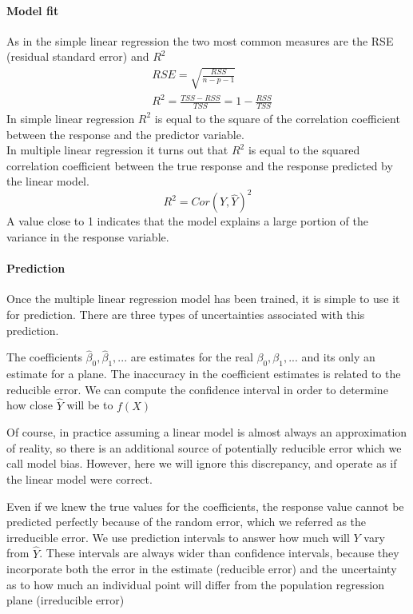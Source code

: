 \documentclass[../document.tex]{subfiles}
\begin{document}
	\paragraph{Model fit}
	As in the simple linear regression the two most common measures are the RSE (residual standard error) and \(R^2\)
	\begin{equation}
	\begin{split}
		&RSE = \sqrt{\frac{RSS}{n-p-1}}\\
		&R^2 = \frac{TSS-RSS}{TSS}=1-\frac{RSS}{TSS}
	\end{split}
	\end{equation}
	In simple linear regression \(R^2\) is equal to the square of the correlation coefficient between the response and the predictor variable.\\
	In multiple linear regression it turns out that \(R^2\) is equal to the squared correlation coefficient between the true response and the response predicted by the linear model.
	\begin{equation}
		R^2=Cor(Y,\hat{Y})^2
	\end{equation}
	A value close to 1 indicates that the model explains a large portion of the variance in the response variable.

	\paragraph{Prediction}
	Once the multiple linear regression model has been trained, it is simple to use it for prediction. There are three types of uncertainties associated with this prediction.
	\begin{description}
		\item The coefficients \(\hat{\beta}_{0},\hat{\beta}_{1},...\) are estimates for the real \(\beta_{0},\beta_{1},...\) and its only an estimate for a plane. The inaccuracy in the coefficient estimates is related to the reducible error. We can compute the confidence interval in order to determine how close \(\hat{Y}\) will be to \(f(X)\)
		\item Of course, in practice assuming a linear model is almost always an approximation of reality, so there is an additional source of potentially reducible error which we call model bias. However, here we will ignore this discrepancy, and operate as if the linear model were correct.
		\item Even if we knew the true values for the coefficients, the response value cannot be predicted perfectly because of the random error, which we referred as the irreducible error. We use prediction intervals to answer how much will \(Y\) vary from \(\hat{Y}\). These intervals are always wider than confidence intervals, because they incorporate both the error in the estimate (reducible error) and the uncertainty as to how much an individual point will differ from the population regression plane (irreducible error)
	\end{description}
\end{document}

